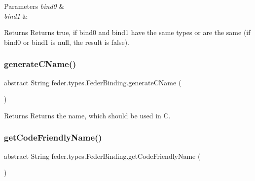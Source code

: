 \begin{DoxyParams}{Parameters}
{\em bind0} & \\
\hline
{\em bind1} & \\
\hline
\end{DoxyParams}
\begin{DoxyReturn}{Returns}
Returns true, if bind0 and bind1 have the same types or are the same (if bind0 or bind1 is null, the result is false). 
\end{DoxyReturn}
\mbox{\label{classfeder_1_1types_1_1FederBinding_a8a3a3d920f5312db5beff5c82071cb12}} 
\subsubsection{\texorpdfstring{generate\+C\+Name()}{generateCName()}}
{\footnotesize\ttfamily abstract String feder.\+types.\+Feder\+Binding.\+generate\+C\+Name (\begin{DoxyParamCaption}{ }\end{DoxyParamCaption})\hspace{0.3cm}{\ttfamily [abstract]}}

\begin{DoxyReturn}{Returns}
Returns the name, which should be used in C. 
\end{DoxyReturn}
\mbox{\label{classfeder_1_1types_1_1FederBinding_a237e4d83da1cee7e4bcaecea513c4b9d}} 
\subsubsection{\texorpdfstring{get\+Code\+Friendly\+Name()}{getCodeFriendlyName()}}
{\footnotesize\ttfamily abstract String feder.\+types.\+Feder\+Binding.\+get\+Code\+Friendly\+Name (\begin{DoxyParamCaption}{ }\end{DoxyParamCaption})\hspace{0.3cm}{\ttfamily [abstract]}}

